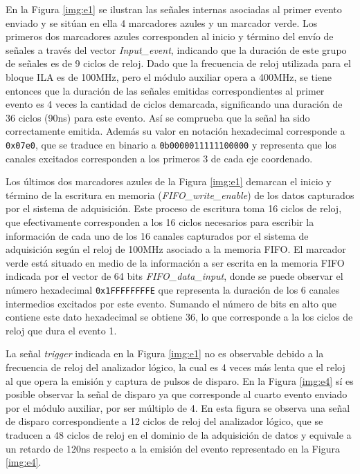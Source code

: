 	En la Figura \ref{img:e1} se ilustran las señales internas asociadas al primer evento enviado y se sitúan en ella 4 marcadores azules y un marcador verde. Los primeros dos marcadores azules corresponden al inicio y término del envío de señales a través del vector \textit{Input\_event}, indicando que la duración de este grupo de señales es de 9 ciclos de reloj. Dado que la frecuencia de reloj utilizada para el bloque ILA es de 100MHz, pero el módulo auxiliar opera a 400MHz, se tiene entonces que la duración de las señales emitidas correspondientes al primer evento es 4 veces la cantidad de ciclos demarcada, significando una duración de 36 ciclos (90ns) para este evento. Así se comprueba que la señal ha sido correctamente emitida. Además su valor en notación hexadecimal corresponde a \texttt{0x07e0}, que se traduce en binario a \texttt{0b0000011111100000} y representa que los canales excitados corresponden a los primeros 3 de cada eje coordenado.  %
	
	Los últimos dos marcadores azules de la Figura \ref{img:e1} demarcan el inicio y término de la escritura en memoria (\textit{FIFO\_write\_enable}) de los datos capturados por el sistema de adquisición. Este proceso de escritura toma 16 ciclos de reloj, que efectivamente corresponden a los 16 ciclos necesarios para escribir la información de cada uno de los 16 canales capturados por el sistema de adquisición según el reloj de 100MHz asociado a la memoria FIFO. El marcador verde está situado en medio de la información a ser escrita en la memoria FIFO indicada por el vector de 64 bits \textit{FIFO\_data\_input}, donde se puede observar el número hexadecimal \texttt{0x1FFFFFFFFE} que representa la duración de los 6 canales intermedios excitados por este evento. Sumando el número de bits en alto que contiene este dato hexadecimal se obtiene 36, lo que corresponde a la los ciclos de reloj que dura el evento 1.
	
	La señal \textit{trigger} indicada en la Figura \ref{img:e1} no es observable debido a la frecuencia de reloj del analizador lógico, la cual es 4 veces más lenta que el reloj al que opera la emisión y captura de pulsos de disparo. En la Figura \ref{img:e4} sí es posible observar la señal de disparo ya que corresponde al cuarto evento enviado por el módulo auxiliar, por ser múltiplo de 4. En esta figura se observa una señal de disparo correspondiente a 12 ciclos de reloj del analizador lógico, que se traducen a 48 ciclos de reloj en el dominio de la adquisición de datos y equivale a un retardo de 120ns respecto a la emisión del evento representado en la Figura \ref{img:e4}.
	

